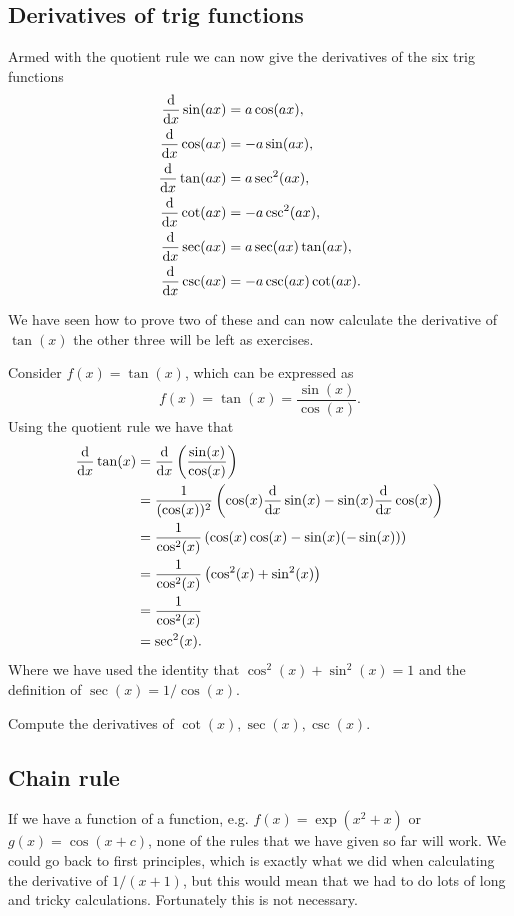 \subsection*{Derivatives of trig functions}
Armed with the quotient rule we can now give the derivatives of the six trig functions
\begin{align}
\frac{\mathrm{d}}{\mathrm{d} x}\sin(ax)&=a\cos(ax),\label{eq: sine derivative}\\
\frac{\mathrm{d}}{\mathrm{d} x}\cos(ax)&=-a\sin(ax),\label{eq: cos derivative}\\
\frac{\mathrm{d}}{\mathrm{d} x}\tan(ax)&=a\sec^{2}(ax),\label{eq: tan derivative}\\
\frac{\mathrm{d}}{\mathrm{d} x}\cot(ax)&=-a\csc^{2}(ax),\label{eq: cot derivative}\\
\frac{\mathrm{d}}{\mathrm{d} x}\sec(ax)&=a\sec(ax)\tan(ax), \label{eq: sec derivative}\\
\frac{\mathrm{d}}{\mathrm{d} x}\csc(ax)&=-a\csc(ax)\cot(ax).\label{eq: csc derivative}
\end{align}

We have seen how to prove two of these and can now calculate the derivative of $\tan(x)$ the other three will be left as exercises.
\begin{ex}
Consider $f(x)=\tan(x)$, which can be expressed as
\begin{equation*}
f(x)=\tan(x)=\frac{\sin(x)}{\cos(x)}.
\end{equation*}
Using the quotient rule we have that
\begin{align*}
\frac{\mathrm{d}}{\mathrm{d} x}\tan(x)	&=\frac{\mathrm{d} }{\mathrm{d} x}\left(\frac{\sin(x)}{\cos(x)}\right)\\
				&=\frac{1}{(\cos(x))^{2}}\left(\cos(x)\frac{\mathrm{d} }{\mathrm{d} x}\sin(x)-\sin(x)\frac{\mathrm{d} }{\mathrm{d} x}\cos(x)\right)\\
				&=\frac{1}{\cos^{2}(x)}\left(\cos(x)\cos(x)-\sin(x)(-\sin(x))\right)\\
				&=\frac{1}{\cos^{2}(x)}\left(\cos^{2}(x)+\sin^{2}(x)\right)\\
				&=\frac{1}{\cos^{2}(x)}\\
				&=\sec^{2}(x).
\end{align*}
Where we have used the identity that $\cos^{2}(x)+\sin^{2}(x)=1$ and the definition of $\sec(x)=1/\cos(x)$.
\end{ex}

\begin{exercise}
Compute the derivatives of $\cot(x), \sec(x),\csc(x)$.
\end{exercise}

\subsection*{Chain rule}
If we have a function of a function, e.g. $f(x)=\exp\left(x^{2}+x\right)$ or $g(x)=\cos\left(x+c\right)$, none of the rules that we have given so far will work. We could go back to first principles, which is exactly what we did when calculating the derivative of $1/(x+1)$, but this would mean that we had to do lots of long and tricky calculations. Fortunately this is not necessary.\\

